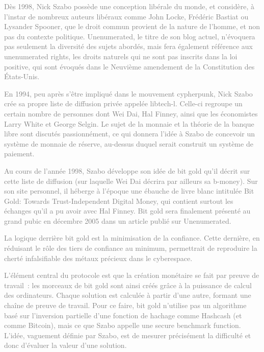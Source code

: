 \textcolor{gray}{Dès 1998, Nick Szabo possède une conception libérale du monde, et considère, à l'instar de nombreux auteurs libéraux comme John Locke, Frédéric Bastiat ou Lysander Spooner, que le droit commun provient de la nature de l'homme, et non pas du contexte politique. Unenumerated, le titre de son blog actuel, n'évoquera pas seulement la diversité des sujets abordés, mais fera également référence aux unenumerated rights, les droits naturels qui ne sont pas inscrits dans la loi positive, qui sont évoqués dans le Neuvième amendement de la Constitution des États-Unis.}

\textcolor{gray}{En 1994, peu après s'être impliqué dans le mouvement cypherpunk, Nick Szabo crée sa propre liste de diffusion privée appelée libtech-l. Celle-ci regroupe un certain nombre de personnes dont Wei Dai, Hal Finney, ainsi que les économistes Larry White et George Selgin. Le sujet de la monnaie et la théorie de la banque libre sont discutés passionnément, ce qui donnera l'idée à Szabo de concevoir un système de monnaie de réserve, au-dessus duquel serait construit un système de paiement.}

\textcolor{gray}{Au cours de l'année 1998, Szabo développe son idée de bit gold qu'il décrit sur cette liste de diffusion (sur laquelle Wei Dai décrira par ailleurs sa b-money). Sur son site personnel, il héberge à l'époque une ébauche de livre blanc intitulée Bit Gold: Towards Trust-Independent Digital Money, qui contient surtout les échanges qu'il a pu avoir avec Hal Finney. Bit gold sera finalement présenté au grand pubic en décembre 2005 dans un article publié sur Unenumerated.}

\textcolor{gray}{La logique derrière bit gold est la minimisation de la confiance. Cette dernière, en réduisant le rôle des tiers de confiance au minimum, permettrait de reproduire la cherté infalsifiable des métaux précieux dans le cyberespace.}

\textcolor{gray}{L'élément central du protocole est que la création monétaire se fait par preuve de travail~: les morceaux de bit gold sont ainsi créés grâce à la puissance de calcul des ordinateurs. Chaque solution est calculée à partir d'une autre, formant une chaîne de preuve de travail. Pour ce faire, bit gold n'utilise pas un algorithme basé sur l'inversion partielle d'une fonction de hachage comme Hashcash (et comme Bitcoin), mais ce que Szabo appelle une secure benchmark function. L'idée, vaguement définie par Szabo, est de mesurer précisément la difficulté et donc d'évaluer la valeur d'une solution.}

